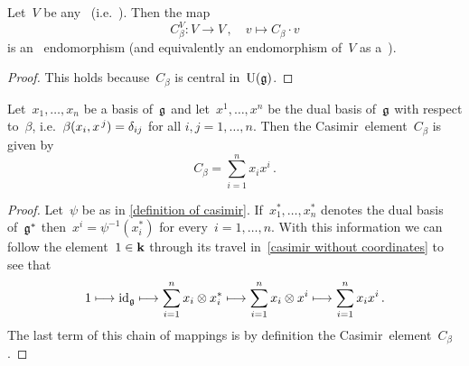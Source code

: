 \begin{corollary}
  \label{casimir homomorphism of a representation}
  Let~$V$ be any~{\module{$\Univ(\glie)$}} (i.e.~{\representation{$\glie$}}).
  Then the map
  \[
    C_\beta^V
    \colon
    V
    \to
    V \,,
    \quad
    v
    \mapsto
    C_\beta \cdot v
  \]
  is an~{\module{$\Univ(\glie)$}} endomorphism (and equivalently an endomorphism of~$V$ as a~{\representation{$\glie$}}).
\end{corollary}


\begin{proof}
  This holds because~$C_\beta$ is central in~$\Univ(\glie)$.
\end{proof}


\begin{lemma}
  \label{casimir in coordinates}
  Let~$x_1, \dotsc, x_n$ be a basis of~$\glie$ and let~$x^1, \dotsc, x^n$ be the dual basis of~$\glie$ with respect to~$\beta$, i.e.\ $\beta(x_i, x^{\, j}) = \delta_{ij}$ for all $i,j = 1, \dotsc, n$.
  Then the Casimir~element~$C_\beta$ is given by
  \[
    C_\beta = \sum_{i=1}^n x_i x^i  \,.
  \]
\end{lemma}


\begin{proof}
  Let~$\psi$ be as in \cref{definition of casimir}.
  If~$x_1^*, \dotsc, x_n^*$ denotes the dual basis of~$\mathfrak{g}^*$ then~$x^i = \psi^{-1}(x_i^*)$ for every~$i = 1, \dotsc, n$.
  With this information we can follow the element~$1 \in \mathbf{k}$ through its travel in~\eqref{casimir without coordinates} to see that
  \[
    1
    \longmapsto
    \operatorname{id}_{\mathfrak{g}}
    \longmapsto
    \sum_{i=1}^n x_i \otimes x_i^*
    \longmapsto
    \sum_{i=1}^n x_i \otimes x^i
    \longmapsto
    \sum_{i=1}^n x_i x^i  \,.
  \]
  The last term of this chain of mappings is by definition the Casimir~element~$C_\beta$.
\end{proof}


